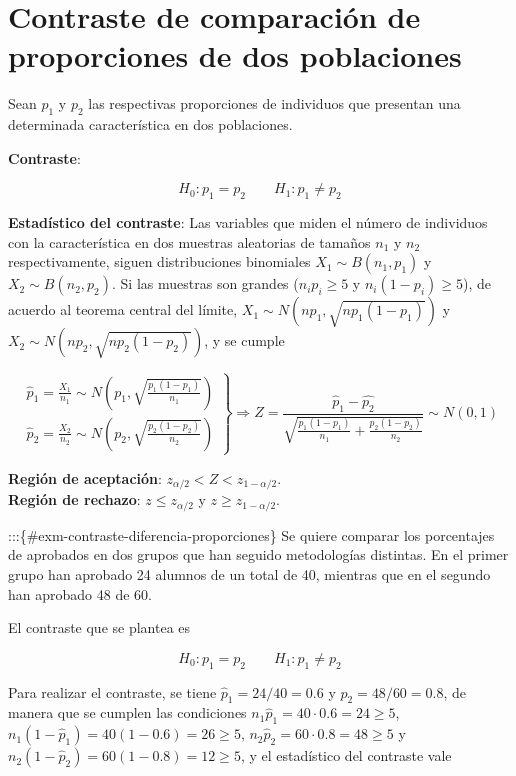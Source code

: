 \documentclass[
  a4paper,
]{scrreport}
\theoremstyle{definition}
\theoremstyle{definition}
\theoremstyle{plain}
\theoremstyle{remark}
\begin{document}
\hypertarget{contraste-de-comparaciuxf3n-de-proporciones-de-dos-poblaciones}{%
\section{Contraste de comparación de proporciones de dos
poblaciones}\label{contraste-de-comparaciuxf3n-de-proporciones-de-dos-poblaciones}}

Sean \(p_1\) y \(p_2\) las respectivas proporciones de individuos que
presentan una determinada característica en dos poblaciones.

\textbf{Contraste}:

\[
H_0: p_1=p_2\qquad H_1: p_1\neq p_2
\]

\textbf{Estadístico del contraste}: Las variables que miden el número de
individuos con la característica en dos muestras aleatorias de tamaños
\(n_1\) y \(n_2\) respectivamente, siguen distribuciones binomiales
\(X_1\sim B(n_1,p_1)\) y \(X_2\sim B(n_2,p_2)\). Si las muestras son
grandes (\(n_ip_i\geq 5\) y \(n_i(1-p_i)\geq 5\)), de acuerdo al teorema
central del límite, \(X_1\sim N(np_1,\sqrt{np_1(1-p_1)})\) y
\(X_2\sim N(np_2,\sqrt{np_2(1-p_2)})\), y se cumple

\[
\left.
\begin{array}{l}
\hat{p}_1=\frac{X_1}{n_1} \sim N\left(p_1,\sqrt{\frac{p_1(1-p_1)}{n_1}}\right) \\
\hat{p}_2=\frac{X_2}{n_2} \sim N\left(p_2,\sqrt{\frac{p_2(1-p_2)}{n_2}}\right)
\end{array}
\right\}
\Rightarrow Z = \frac{\hat{p}_1-\hat{p_2}}{\sqrt{\frac{p_1(1-p_1)}{n_1}+\frac{p_2(1-p_2)}{n_2}}}\sim N(0,1)
\]

\textbf{Región de aceptación}: \(z_{\alpha/2}< Z < z_{1-\alpha/2}\).\\
\textbf{Región de rechazo}: \(z\leq z_{\alpha/2}\) y
\(z\geq z_{1-\alpha/2}\).

:::\{\#exm-contraste-diferencia-proporciones\} Se quiere comparar los
porcentajes de aprobados en dos grupos que han seguido metodologías
distintas. En el primer grupo han aprobado 24 alumnos de un total de 40,
mientras que en el segundo han aprobado 48 de 60.

El contraste que se plantea es

\[
H_0: p_1=p_2\qquad H_1: p_1\neq p_2
\]

Para realizar el contraste, se tiene \(\hat{p}_1=24/40= 0.6\) y
\(\hat{p}_2=48/60=0.8\), de manera que se cumplen las condiciones
\(n_1\hat{p}_1=40\cdot 0.6=24\geq 5\),
\(n_1(1-\hat{p}_1)=40(1-0.6)=26\geq 5\),
\(n_2\hat{p}_2=60\cdot 0.8=48\geq 5\) y
\(n_2(1-\hat{p}_2)=60(1-0.8)=12\geq 5\), y el estadístico del contraste
vale
\end{document}

